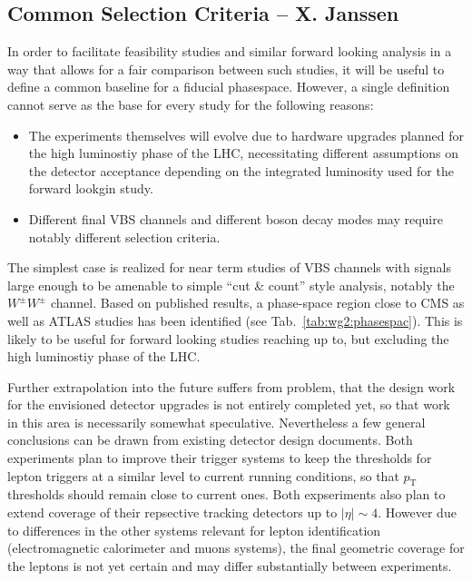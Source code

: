 \subsection{Common Selection Criteria -- X. Janssen}

In order to facilitate feasibility studies and similar forward looking analysis in a way that allows for a fair comparison between such studies, it will be useful to define a common baseline for a fiducial phasespace. However, a single definition cannot serve as the base for every study for the following reasons:
\begin{itemize}
\item The experiments themselves will evolve due to hardware upgrades planned for the high luminostiy phase of the LHC, necessitating different assumptions on the detector acceptance depending on the integrated luminosity used for the forward lookgin study.
\item Different final VBS channels and different boson decay modes may require notably different selection criteria.
\end{itemize}

The simplest case is realized for near term studies of VBS channels with signals large enough to be amenable to simple ``cut \& count'' style analysis, notably the $W^\pm W^\pm$ channel. Based on published results, a phase-space region close to CMS as well as ATLAS studies has been identified (see Tab.~\ref{tab:wg2:phasespac}). This is likely to be useful for forward looking studies reaching up to, but excluding the high luminostiy phase of the LHC.

Further extrapolation into the future suffers from problem, that the design work for the envisioned detector upgrades is not entirely completed yet, so that work in this area is necessarily somewhat speculative. Nevertheless a few general conclusions can be drawn from existing detector design documents. Both experiments plan to improve their trigger systems to keep the thresholds for lepton triggers at a similar level to current running conditions, so that $p_{\mathrm{T}}$ thresholds should remain close to current ones. Both expseriments also plan to extend coverage of their repsective tracking detectors up to $|\eta|\sim 4$. However due to differences in the other systems relevant for lepton identification (electromagnetic calorimeter and muons systems), the final geometric coverage for the leptons is not yet certain and may differ substantially between experiments.

